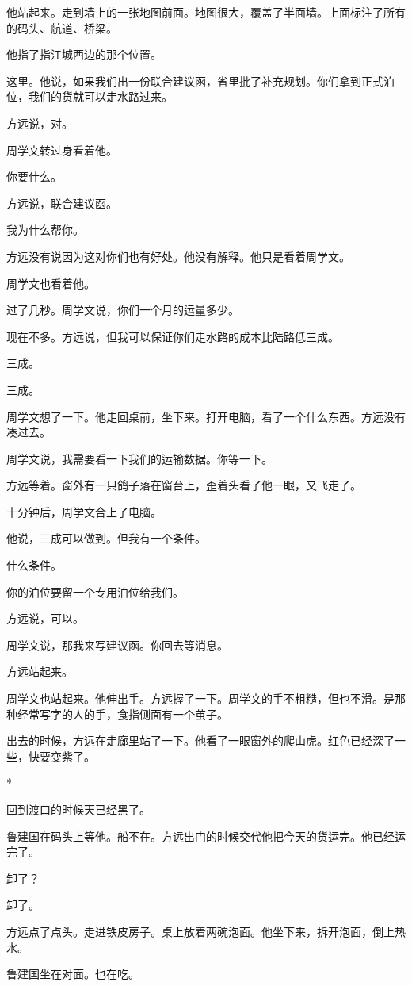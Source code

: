 \documentclass[UTF8,a5paper,11pt,openany]{ctexbook}
\newcommand{\scene}{\vspace{1em}\begin{center}*\quad*\quad*\end{center}\vspace{0.5em}}
\begin{document}
他站起来。走到墙上的一张地图前面。地图很大，覆盖了半面墙。上面标注了所有的码头、航道、桥梁。

他指了指江城西边的那个位置。

这里。他说，如果我们出一份联合建议函，省里批了补充规划。你们拿到正式泊位，我们的货就可以走水路过来。

方远说，对。

周学文转过身看着他。

你要什么。

方远说，联合建议函。

我为什么帮你。

方远没有说因为这对你们也有好处。他没有解释。他只是看着周学文。

周学文也看着他。

过了几秒。周学文说，你们一个月的运量多少。

现在不多。方远说，但我可以保证你们走水路的成本比陆路低三成。

三成。

三成。

周学文想了一下。他走回桌前，坐下来。打开电脑，看了一个什么东西。方远没有凑过去。

周学文说，我需要看一下我们的运输数据。你等一下。

方远等着。窗外有一只鸽子落在窗台上，歪着头看了他一眼，又飞走了。

十分钟后，周学文合上了电脑。

他说，三成可以做到。但我有一个条件。

什么条件。

你的泊位要留一个专用泊位给我们。

方远说，可以。

周学文说，那我来写建议函。你回去等消息。

方远站起来。

周学文也站起来。他伸出手。方远握了一下。周学文的手不粗糙，但也不滑。是那种经常写字的人的手，食指侧面有一个茧子。

出去的时候，方远在走廊里站了一下。他看了一眼窗外的爬山虎。红色已经深了一些，快要变紫了。


\scene

回到渡口的时候天已经黑了。

鲁建国在码头上等他。船不在。方远出门的时候交代他把今天的货运完。他已经运完了。

卸了？

卸了。

方远点了点头。走进铁皮房子。桌上放着两碗泡面。他坐下来，拆开泡面，倒上热水。

鲁建国坐在对面。也在吃。
\end{document}
